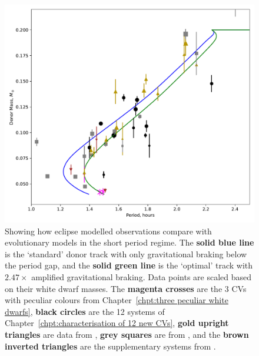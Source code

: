\begin{figure}
    \centering
    \includegraphics[width=\textwidth]{figures/results/K11_donor_track_with_eclipse_modelled_data.pdf}
    \caption{Showing how eclipse modelled observations compare with evolutionary models in the short period regime. The {\bf solid blue line} is the `standard' \citet{knigge11} donor track with only gravitational braking below the period gap, and the {\bf solid green line} is the `optimal' track with $2.47\times$ amplified gravitational braking. Data points are scaled based on their white dwarf masses. The {\bf magenta crosses} are the 3 CVs with peculiar colours from Chapter~\ref{chpt:three peculiar white dwarfs}, {\bf black circles} are the 12 systems of Chapter~\ref{chpt:characterisation of 12 new CVs}, {\bf gold upright triangles} are data from \citet{McAllister2019}, {\bf grey squares} are from \citet{Savoury2011}, and the {\bf brown inverted triangles} are the supplementary systems from \citet{copperwheat2010,mcallister2015,mcallister2017,mcallister2017b}.}
    \label{fig:12 new cvs:donor model with eclipsers plotted}
\end{figure}

